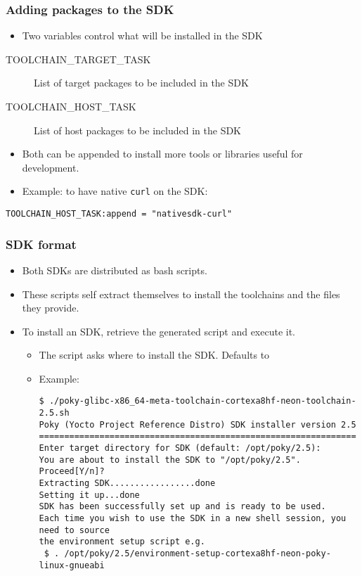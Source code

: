 \begin{frame}[fragile]
  \frametitle{Adding packages to the SDK}
  \begin{itemize}
    \item Two variables control what will be installed in the SDK
  \end{itemize}
  \begin{description}
    \item[TOOLCHAIN\_TARGET\_TASK]
      List of target packages to be included in the SDK
    \item[TOOLCHAIN\_HOST\_TASK]
      List of host packages to be included in the SDK
  \end{description}
  \begin{itemize}
    \item Both can be appended to install more tools or libraries useful
      for development.
    \item Example: to have native {\tt curl} on the SDK:
  \end{itemize}
  \begin{block}{}
    \fontsize{9}{9}\selectfont
    \begin{verbatim}
TOOLCHAIN_HOST_TASK:append = "nativesdk-curl"
    \end{verbatim}
  \end{block}
\end{frame}

\begin{frame}[fragile]
  \frametitle{SDK format}
  \begin{itemize}
    \item Both SDKs are distributed as bash scripts.
    \item These scripts self extract themselves to install the
      toolchains and the files they provide.
    \item To install an SDK, retrieve the generated script and execute
      it.
      \begin{itemize}
        \item The script asks where to install the SDK. Defaults to
        \item Example: 
        \begin{block}{}
          \begin{verbatim}
$ ./poky-glibc-x86_64-meta-toolchain-cortexa8hf-neon-toolchain-2.5.sh
Poky (Yocto Project Reference Distro) SDK installer version 2.5
===============================================================
Enter target directory for SDK (default: /opt/poky/2.5):
You are about to install the SDK to "/opt/poky/2.5". Proceed[Y/n]?
Extracting SDK.................done
Setting it up...done
SDK has been successfully set up and is ready to be used.
Each time you wish to use the SDK in a new shell session, you need to source
the environment setup script e.g.
 $ . /opt/poky/2.5/environment-setup-cortexa8hf-neon-poky-linux-gnueabi
          \end{verbatim}
        \end{block}
      \end{itemize}
  \end{itemize}
\end{frame}

